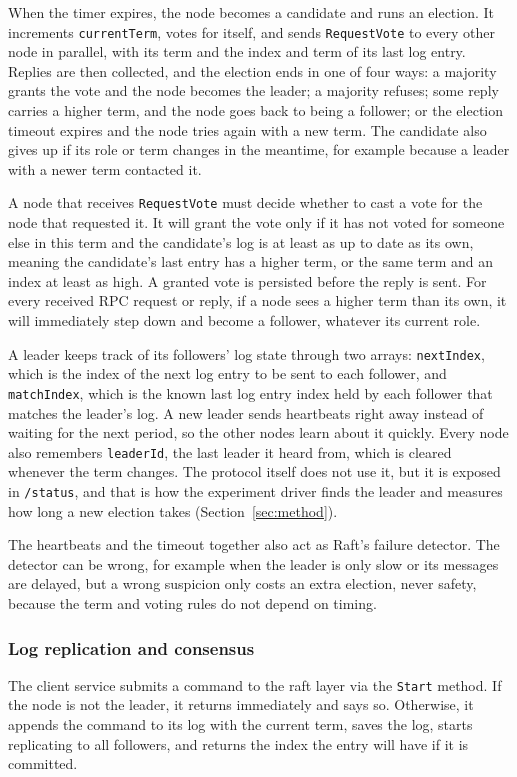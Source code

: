 \documentclass[conference]{IEEEtran}
\begin{document}
When the timer expires, the node becomes a candidate and runs an election. It increments \texttt{currentTerm}, votes for itself, and sends \texttt{RequestVote} to every other node in parallel, with its term and the index and term of its last log entry. Replies are then collected, and the election ends in one of four ways: a majority grants the vote and the node becomes the leader; a majority refuses; some reply carries a higher term, and the node goes back to being a follower; or the election timeout expires and the node tries again with a new term. The candidate also gives up if its role or term changes in the meantime, for example because a leader with a newer term contacted it.

A node that receives \texttt{RequestVote} must decide whether to cast a vote for the node that requested it. It will grant the vote only if it has not voted for someone else in this term and the candidate's log is at least as up to date as its own, meaning the candidate's last entry has a higher term, or the same term and an index at least as high. A granted vote is persisted before the reply is sent. For every received RPC request or reply, if a node sees a higher term than its own, it will immediately step down and become a follower, whatever its current role.

A leader keeps track of its followers' log state through two arrays: \texttt{nextIndex}, which is the index of the next log entry to be sent to each follower, and \texttt{matchIndex}, which is the known last log entry index held by each follower that matches the leader's log. A new leader sends heartbeats right away instead of waiting for the next period, so the other nodes learn about it quickly. Every node also remembers \texttt{leaderId}, the last leader it heard from, which is cleared whenever the term changes. The protocol itself does not use it, but it is exposed in \texttt{/status}, and that is how the experiment driver finds the leader and measures how long a new election takes (Section~\ref{sec:method}).

The heartbeats and the timeout together also act as Raft's failure detector. The detector can be wrong, for example when the leader is only slow or its messages are delayed, but a wrong suspicion only costs an extra election, never safety, because the term and voting rules do not depend on timing.

\subsubsection{\textbf{Log replication and consensus}}\label{sec:algs-replication}
The client service submits a command to the raft layer via the \texttt{Start} method. If the node is not the leader, it returns immediately and says so. Otherwise, it appends the command to its log with the current term, saves the log, starts replicating to all followers, and returns the index the entry will have if it is committed.
\end{document}
